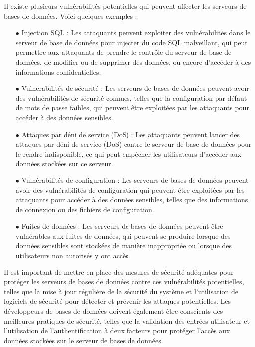 Il existe plusieurs vulnérabilités potentielles qui peuvent affecter les serveurs de bases de données. Voici quelques exemples :
\begin{enumerate}



\item[$\bullet$] Injection SQL : Les attaquants peuvent exploiter des vulnérabilités dans le serveur de base de données pour injecter du code SQL malveillant, qui peut permettre aux attaquants de prendre le contrôle du serveur de base de données, de modifier ou de supprimer des données, ou encore d'accéder à des informations confidentielles.
	
\item[$\bullet$]  Vulnérabilités de sécurité : Les serveurs de bases de données peuvent avoir des vulnérabilités de sécurité connues, telles que la configuration par défaut de mots de passe faibles, qui peuvent être exploitées par les attaquants pour accéder à des données sensibles.
	
\item[$\bullet$]  Attaques par déni de service (DoS) : Les attaquants peuvent lancer des attaques par déni de service (DoS) contre le serveur de base de données pour le rendre indisponible, ce qui peut empêcher les utilisateurs d'accéder aux données stockées sur ce serveur.
	
\item[$\bullet$] Vulnérabilités de configuration : Les serveurs de bases de données peuvent avoir des vulnérabilités de configuration qui peuvent être exploitées par les attaquants pour accéder à des données sensibles, telles que des informations de connexion ou des fichiers de configuration.
	
\item[$\bullet$]  Fuites de données : Les serveurs de bases de données peuvent être vulnérables aux fuites de données, qui peuvent se produire lorsque des données sensibles sont stockées de manière inappropriée ou lorsque des utilisateurs non autorisés y ont accès.
\end{enumerate}
Il est important de mettre en place des mesures de sécurité adéquates pour protéger les serveurs de bases de données contre ces vulnérabilités potentielles, telles que la mise à jour régulière de la sécurité du système et l'utilisation de logiciels de sécurité pour détecter et prévenir les attaques potentielles. Les développeurs de bases de données doivent également être conscients des meilleures pratiques de sécurité, telles que la validation des entrées utilisateur et l'utilisation de l'authentification à deux facteurs pour protéger l'accès aux données stockées sur le serveur de bases de données.
